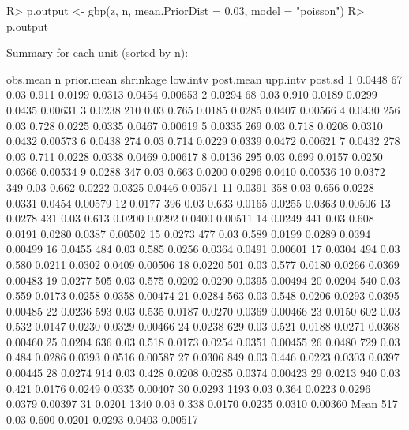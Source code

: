 \documentclass[article]{jss}
\begin{document}
\begin{CodeChunk}
\begin{CodeInput}
R> p.output <- gbp(z, n, mean.PriorDist = 0.03, model = "poisson")
R> p.output
\end{CodeInput}
\begin{CodeOutput}
Summary for each unit (sorted by n):

      obs.mean    n prior.mean shrinkage low.intv post.mean upp.intv post.sd
1       0.0448   67       0.03     0.911   0.0199    0.0313   0.0454 0.00653
2       0.0294   68       0.03     0.910   0.0189    0.0299   0.0435 0.00631
3       0.0238  210       0.03     0.765   0.0185    0.0285   0.0407 0.00566
4       0.0430  256       0.03     0.728   0.0225    0.0335   0.0467 0.00619
5       0.0335  269       0.03     0.718   0.0208    0.0310   0.0432 0.00573
6       0.0438  274       0.03     0.714   0.0229    0.0339   0.0472 0.00621
7       0.0432  278       0.03     0.711   0.0228    0.0338   0.0469 0.00617
8       0.0136  295       0.03     0.699   0.0157    0.0250   0.0366 0.00534
9       0.0288  347       0.03     0.663   0.0200    0.0296   0.0410 0.00536
10      0.0372  349       0.03     0.662   0.0222    0.0325   0.0446 0.00571
11      0.0391  358       0.03     0.656   0.0228    0.0331   0.0454 0.00579
12      0.0177  396       0.03     0.633   0.0165    0.0255   0.0363 0.00506
13      0.0278  431       0.03     0.613   0.0200    0.0292   0.0400 0.00511
14      0.0249  441       0.03     0.608   0.0191    0.0280   0.0387 0.00502
15      0.0273  477       0.03     0.589   0.0199    0.0289   0.0394 0.00499
16      0.0455  484       0.03     0.585   0.0256    0.0364   0.0491 0.00601
17      0.0304  494       0.03     0.580   0.0211    0.0302   0.0409 0.00506
18      0.0220  501       0.03     0.577   0.0180    0.0266   0.0369 0.00483
19      0.0277  505       0.03     0.575   0.0202    0.0290   0.0395 0.00494
20      0.0204  540       0.03     0.559   0.0173    0.0258   0.0358 0.00474
21      0.0284  563       0.03     0.548   0.0206    0.0293   0.0395 0.00485
22      0.0236  593       0.03     0.535   0.0187    0.0270   0.0369 0.00466
23      0.0150  602       0.03     0.532   0.0147    0.0230   0.0329 0.00466
24      0.0238  629       0.03     0.521   0.0188    0.0271   0.0368 0.00460
25      0.0204  636       0.03     0.518   0.0173    0.0254   0.0351 0.00455
26      0.0480  729       0.03     0.484   0.0286    0.0393   0.0516 0.00587
27      0.0306  849       0.03     0.446   0.0223    0.0303   0.0397 0.00445
28      0.0274  914       0.03     0.428   0.0208    0.0285   0.0374 0.00423
29      0.0213  940       0.03     0.421   0.0176    0.0249   0.0335 0.00407
30      0.0293 1193       0.03     0.364   0.0223    0.0296   0.0379 0.00397
31      0.0201 1340       0.03     0.338   0.0170    0.0235   0.0310 0.00360
Mean            517       0.03     0.600   0.0201    0.0293   0.0403 0.00517
\end{CodeOutput}
\end{CodeChunk}
\end{document}

